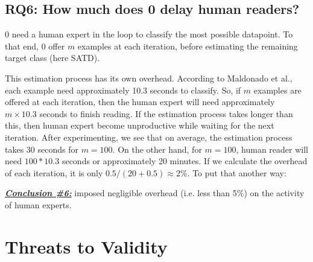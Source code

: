 \documentclass[10pt,conference]{IEEEtran}
\newenvironment{result}[2]
{\begin{myshadowbox}\textbf{\textit{\underline{Conclusion \##1:}}} #2}{ 
\end{myshadowbox}}
\begin{document}
\subsection{ RQ6: How much does {\IT}0 delay human readers?}
{\IT}0 need a human expert in the loop to classify the most possible datapoint. To that end, {\IT}0 offer $m$ examples at each iteration, before estimating the remaining target class (here SATD). 

This estimation process has its own overhead. According to Maldonado et al., each example need approximately 10.3 seconds to classify. So, if $m$ examples are offered at each iteration, then the human expert will need approximately $m \times 10.3$ seconds to finish reading. If the estimation process takes longer than this, then human expert become unproductive while waiting for the next iteration. After experimenting, we see that on average, the estimation process takes 30 seconds for $m=100$. On the other hand, for $m=100$, human reader will need $100*10.3$ seconds or approximately 20 minutes. If we calculate the overhead of each iteration, it is only $0.5/(20+0.5) \approx 2\%$. To put that another way:
\begin{result}{6}
{\IT}0 imposed
negligible overhead  (i.e. less than 5\%) on the activity of human experts.
\end{result}



%

%
\section{Threats to Validity}
\label{section threats to validity}
 

\end{document}
